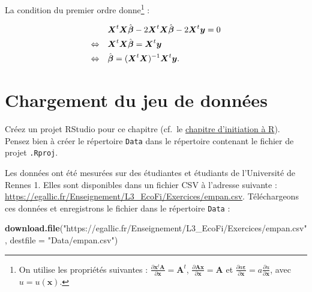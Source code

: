 \documentclass[
  11pt,
]{book}
\newenvironment{Shaded}{\begin{snugshade}}{\end{snugshade}}
\newcommand{\AttributeTok}[1]{\textcolor[rgb]{0.13,0.29,0.53}{#1}}
\newcommand{\FunctionTok}[1]{\textcolor[rgb]{0.13,0.29,0.53}{\textbf{#1}}}
\newcommand{\NormalTok}[1]{#1}
\newcommand{\StringTok}[1]{\textcolor[rgb]{0.31,0.60,0.02}{#1}}
\numberwithin{equation}{section}
\numberwithin{countremarque}{section}
\newenvironment{greenbox}{
  \begin{tcolorbox}[breakable, colback=vert,coltext=black,
                  colframe=grisfonce]}
 {\end{tcolorbox}}
\begin{document}
La condition du premier ordre donne\footnote{On utilise les propriétés suivantes : \(\frac{\partial \boldsymbol x^t \boldsymbol A}{\partial \boldsymbol x} = \boldsymbol A^t\), \(\frac{\partial \boldsymbol A \boldsymbol x}{\partial \boldsymbol x} = \boldsymbol A\) et \(\frac{\partial a \boldsymbol \varepsilon}{\partial \boldsymbol x} = a \frac{\partial u}{\partial \boldsymbol x}\), avec \(u = u(\boldsymbol x)\).} :

\begin{align*}
& \boldsymbol X^t \boldsymbol X\hat{\boldsymbol \beta} - 2 \boldsymbol X^t \boldsymbol X \hat{\boldsymbol \beta} - 2 \boldsymbol X^t \boldsymbol y = 0\notag\\
\Leftrightarrow \quad & \boldsymbol X^t \boldsymbol X \hat{\boldsymbol\beta} = \boldsymbol X^t \boldsymbol y\notag\\
\Leftrightarrow \quad & \hat{\boldsymbol\beta} = (\boldsymbol X^t \boldsymbol X)^{-1} \boldsymbol X^t \boldsymbol y.
\end{align*}

\hypertarget{chargement-du-jeu-de-donnuxe9es}{%
\section{Chargement du jeu de données}\label{chargement-du-jeu-de-donnuxe9es}}

\begin{greenbox}
Créez un projet RStudio pour ce chapitre (cf.~le \protect\hyperlink{initiation-uxe0-r}{chapitre d'initiation à R}). Pensez bien à créer le répertoire \texttt{Data} dans le répertoire contenant le fichier de projet \texttt{.Rproj}.

\end{greenbox}

Les données ont été mesurées sur des étudiantes et étudiants de l'Université de Rennes 1. Elles sont disponibles dans un fichier CSV à l'adresse suivante : \url{https://egallic.fr/Enseignement/L3_EcoFi/Exercices/empan.csv}. Téléchargeons ces données et enregistrons le fichier dans le répertoire \texttt{Data} :

\begin{Shaded}
\begin{Highlighting}[]
\FunctionTok{download.file}\NormalTok{(}\StringTok{"https://egallic.fr/Enseignement/L3\_EcoFi/Exercices/empan.csv"}\NormalTok{,}
              \AttributeTok{destfile =} \StringTok{"Data/empan.csv"}\NormalTok{)}
\end{Highlighting}
\end{Shaded}
\end{document}
